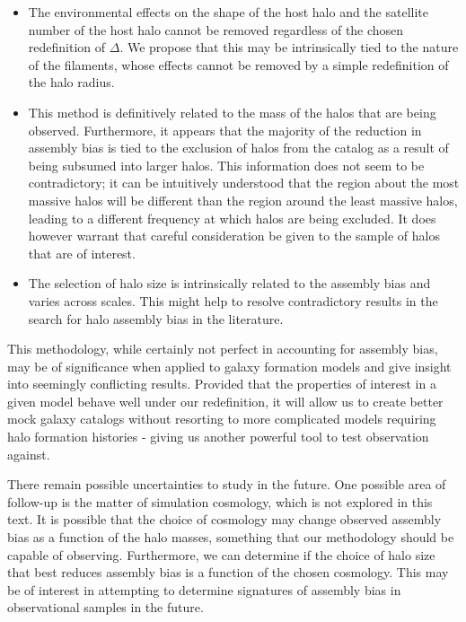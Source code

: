 \documentclass[usenatbib,usegraphicx,letterpaper]{mn2e}
\begin{document}
\begin{itemize}
	\item The environmental effects on the shape of the host halo and the satellite number of the host halo cannot be removed regardless of the chosen redefinition of $\Delta$. We propose that this may be intrinsically tied to the nature of the filaments, whose effects cannot be removed by a simple redefinition of the halo radius.

	\item This method is definitively related to the mass of the halos that are being observed. Furthermore, it appears that the majority of the reduction in assembly bias is tied to the exclusion of halos from the catalog as a result of being subsumed into larger halos. This information does not seem to be contradictory; it can be intuitively understood that the region about the most massive halos will be different than the region around the least massive halos, leading to a different frequency at which halos are being excluded. It does however warrant that careful consideration be given to the sample of halos that are of interest.

	\item The selection of halo size is intrinsically related to the assembly bias and varies across scales. This might help to resolve contradictory results in the search for halo assembly bias in the literature.
\end{itemize}

This methodology, while certainly not perfect in accounting for assembly bias, may be of significance when applied to galaxy formation models and give insight into seemingly conflicting results. Provided that the properties of interest in a given model behave well under our redefinition, it will allow us to create better mock galaxy catalogs without resorting to more complicated models requiring halo formation histories - giving us another powerful tool to test observation against.

There remain possible uncertainties to study in the future. One possible area of follow-up is the matter of simulation cosmology, which is not explored in this text. It is possible that the choice of cosmology may change observed assembly bias as a function of the halo masses, something that our methodology should be capable of observing. Furthermore, we can determine if the choice of halo size that best reduces assembly bias is a function of the chosen cosmology. This may be of interest in attempting to determine signatures of assembly bias in observational samples in the future.
\end{document}
